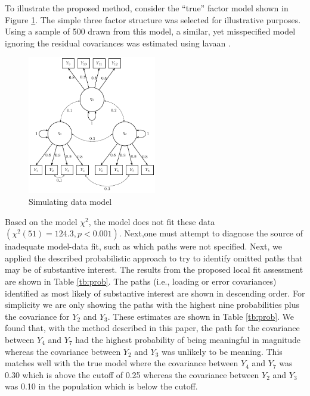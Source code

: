 \documentclass[man, noextraspace, floatsintext, 12pt]{apa7}
\begin{document}
To illustrate the proposed method, consider the ``true'' factor model shown in Figure \ref{fig:model}.
The simple three factor structure was selected for illustrative purposes. 
Using a sample of 500 drawn from this model, a similar, yet misspecified model ignoring the residual covariances was estimated using \textsf{lavaan} \citep{Rosseel2012}.
\begin{figure}
\centering
\includegraphics[width=0.5\textwidth]{fig/sim_factor_structure_values}
\caption{Simulating data model}
\label{fig:model}
\end{figure}
Based on the model $\chi^2$, the model does not fit these data $(\chi^2(51) = 124.3, p < 0.001)$.
Next,one must attempt to diagnose the source of inadequate model-data fit, such as which paths were not specified.
Next, we applied the described probabilistic approach to try to identify omitted paths that may be of substantive interest. 
The results from the proposed local fit assessment are shown in Table \ref{tb:prob}. 
The paths (i.e., loading or  error covariances) identified as most likely of substantive interest are shown in descending order.
For simplicity we are only showing the paths with the highest nine probabilities plus the covariance for $Y_2$ and $Y_3$.
These estimates are shown in Table \ref{tb:prob}.
We found that, with the method described in this paper, the path for the covariance between $Y_4$ and $Y_7$ had the highest probability of being meaningful in magnitude whereas the covariance between $Y_2$ and $Y_3$ was unlikely to be meaning.
This matches well with the true model where the covariance between $Y_4$ and $Y_7$ was 0.30 which is above the cutoff of 0.25 whereas the covariance between $Y_2$ and $Y_3$ was 0.10 in the population which is below the cutoff.
\end{document}
